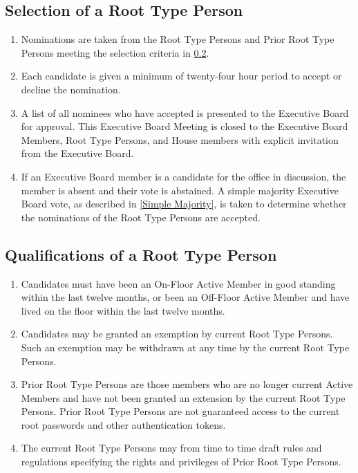\documentclass{article}
\newcommand{\bsection}[1]{\subsection{#1} \label{#1}}
\begin{document}
\bsection{Selection of a Root Type Person}
\renewcommand{\theenumi}{\alph{enumi}} %
\begin{enumerate}
	\item Nominations are taken from the Root Type Persons and Prior Root Type Persons meeting the selection criteria in \ref{Qualifications of a Root Type Person}.
	\item Each candidate is given a minimum of twenty-four hour period to accept or decline the nomination.
	\item A list of all nominees who have accepted is presented to the Executive Board for approval.
		This Executive Board Meeting is closed to the Executive Board Members, Root Type Persons, and House members with explicit invitation from the Executive Board.
	\item If an Executive Board member is a candidate for the office in discussion, the member is absent and their vote is abstained.
		A simple majority Executive Board vote, as described in \ref{Simple Majority}, is taken to determine whether the nominations of the Root Type Persons are accepted.
\end{enumerate}

\bsection{Qualifications of a Root Type Person}
\renewcommand{\theenumi}{\alph{enumi}} %
\begin{enumerate}
	\item Candidates must have been an On-Floor Active Member in good standing within the last twelve months, or been an Off-Floor Active Member and have lived on the floor within the last twelve months.
	\item Candidates may be granted an exemption by current Root Type Persons.
		Such an exemption may be withdrawn at any time by the current Root Type Persons.
	\item Prior Root Type Persons are those members who are no longer current Active Members and have not been granted an extension by the current Root Type Persons.
		Prior Root Type Persons are not guaranteed access to the current root passwords and other authentication tokens.
	\item The current Root Type Persons may from time to time draft rules and regulations specifying the rights and privileges of Prior Root Type Persons.
\end{enumerate}
\end{document}
